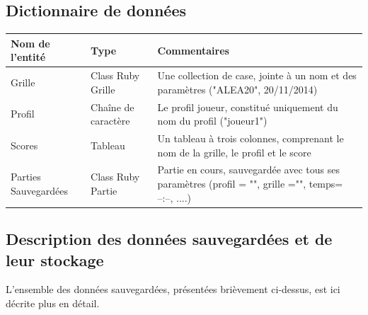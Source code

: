 \documentclass[11pt]{article}
\begin{document}
\subsection{Dictionnaire de données}


\begin{tabular}{|p{4cm}|p{3cm}|p{8cm}|} \hline 
    {\bf Nom de l'entité} & {\bf Type } & {\bf Commentaires}\\ \hline \hline
    Grille & Class Ruby Grille & Une collection de case, jointe à un nom et des paramètres ("ALEA20", 20/11/2014)\\ \hline
    Profil & Chaîne de caractère & Le profil joueur, constitué uniquement du nom du profil ("joueur1")\\ \hline
    Scores & Tableau & Un tableau à trois colonnes, comprenant le nom de la grille, le profil et le score\\ \hline
    Parties Sauvegardées & Class Ruby Partie & Partie en cours, sauvegardée avec tous ses paramètres (profil = "", grille ="", temps= --:--, ....) \\ \hline 
\end{tabular}

\subsection{Description des données sauvegardées et de leur stockage}
L'ensemble des données sauvegardées, présentées brièvement ci-dessus, est ici décrite plus en détail.
\end{document}
